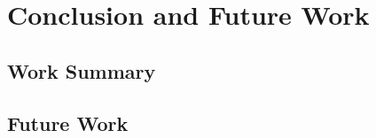 
\chapter{Conclusion and Future Work}\label{chapter:conclusion_and_future_work}

\section{Work Summary}

\section{Future Work}